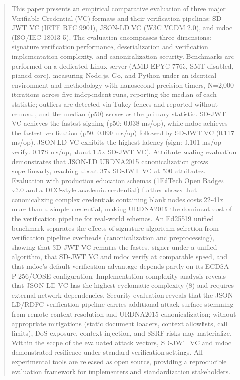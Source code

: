\documentclass[conference]{IEEEtran}
\begin{document}
\begin{abstract}
This paper presents an empirical comparative evaluation of three major Verifiable Credential (VC) formats and their verification pipelines: SD-JWT VC (IETF RFC 9901), JSON-LD VC (W3C VCDM 2.0), and mdoc (ISO/IEC 18013-5). The evaluation encompasses three dimensions: signature verification performance, deserialization and verification implementation complexity, and canonicalization security. Benchmarks are performed on a dedicated Linux server (AMD EPYC 7763, SMT disabled, pinned core), measuring Node.js, Go, and Python under an identical environment and methodology with nanosecond-precision timers, N=2,000 iterations across five independent runs, reporting the median of each statistic; outliers are detected via Tukey fences and reported without removal, and the median (p50) serves as the primary statistic. SD-JWT VC achieves the fastest signing (p50: 0.038 ms/op), while mdoc achieves the fastest verification (p50: 0.090 ms/op) followed by SD-JWT VC (0.117 ms/op). JSON-LD VC exhibits the highest latency (sign: 0.101 ms/op, verify: 0.178 ms/op, about 1.5x SD-JWT VC). Attribute scaling evaluation demonstrates that JSON-LD URDNA2015 canonicalization grows superlinearly, reaching about 37x SD-JWT VC at 500 attributes. Evaluation with production education schemas (1EdTech Open Badges v3.0 and a DCC-style academic credential) further shows that canonicalizing complex credentials containing blank nodes costs 22-41x more than a simple credential, making URDNA2015 the dominant cost of the verification pipeline for real-world schemas. An Ed25519 unified benchmark separates the effects of signature algorithm selection from verification pipeline overheads (canonicalization and preprocessing), showing that SD-JWT VC remains the fastest signer under a unified algorithm, that SD-JWT VC and mdoc verify at comparable speed, and that mdoc's default verification advantage depends partly on its ECDSA P-256/COSE configuration. Implementation complexity analysis reveals that JSON-LD VC has the highest cyclomatic complexity (8) and requires external network dependencies. Security evaluation reveals that the JSON-LD/RDFC verification pipeline carries additional attack surface stemming from remote context resolution and URDNA2015 canonicalization; without appropriate mitigations (static document loaders, context allowlists, call limits), DoS exposure, context injection, and SSRF risks may materialize. Within the scope of the evaluated attack vectors, SD-JWT VC and mdoc demonstrated resilience under standard verification settings. All experimental tools are released as open source, providing a reproducible evaluation framework for implementers and standardization stakeholders.
\end{abstract}
\end{document}
